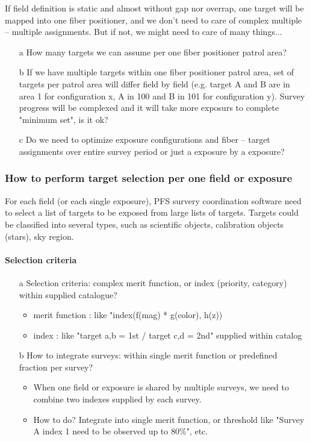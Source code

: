 \documentclass[a4paper,notitlepage]{article}
\newcommand{\cols}[1]{\textcolor{ccols}{#1}}
\newcommand{\coll}[1]{\textcolor{ccoll}{#1}}
\begin{document}
If field definition is static and almost without gap nor overrap, 
one target will be mapped into one fiber positioner, and we don't need to 
care of complex multiple -- multiple assignments. 
But if not, we might need to care of many things... 

\begin{enumerate}
  \item[\cols{a}] How many targets we can assume per one fiber positioner patrol 
    area?
  \item[b] If we have multiple targets within one fiber positioner patrol 
    area, set of targets per patrol area will differ field by field 
    (e.g. target A and B are in area 1 for configuration x, 
    A in 100 and B in 101 for configuration y). 
    Survey progress will be complexed and it will take more exposurs to 
    complete "minimum set", is it ok?
  \item[c] Do we need to optimize exposure configurations and fiber -- target 
    assignments over entire survey period or just a exposure by a exposure? 
\end{enumerate}


\subsubsection{How to perform target selection per one field or exposure}

For each field (or each single exposure), PFS survery coordination software 
need to select a list of targets to be exposed from large lists of targets. 
Targets could be classified into several types, such as scientific objects, 
calibration objects (stars), sky region. 

\paragraph{Selection criteria}

\begin{enumerate}
  \item[\coll{a}] Selection criteria: complex merit function, or index (priority, 
    category) within supplied catalogue?
    \begin{itemize}
      \item merit function : like "index(f(mag) * g(color), h(z))
      \item index : like "target a,b = 1st / target c,d = 2nd" supplied within 
        catalog
    \end{itemize}
  \item[\coll{b}] How to integrate surveys: within single merit function or predefined 
    fraction per survey?
    \begin{itemize}
      \item When one field or exposure is shared by multiple surveys, we need 
        to combine two indexes supplied by each survey.
      \item How to do? Integrate into single merit function, or threshold like 
        "Survey A index 1 need to be observed up to 80\%", etc.
    \end{itemize}
\end{enumerate}
\end{document}
